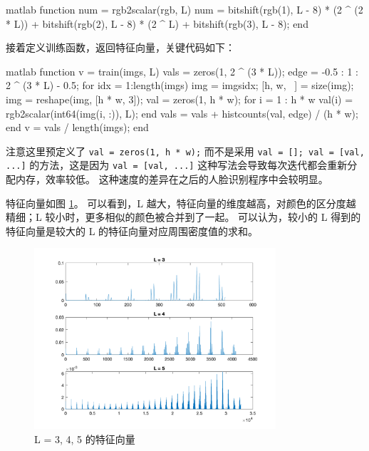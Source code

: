 \documentclass[a4paper]{article}  %
\begin{document}
\begin{codeblock}{matlab}
function num = rgb2scalar(rgb, L)
    num = bitshift(rgb(1), L - 8) * (2 ^ (2 * L)) + bitshift(rgb(2), L - 8) * (2 ^ L) + bitshift(rgb(3), L - 8);
end
\end{codeblock}

接着定义训练函数，返回特征向量，关键代码如下：

\begin{codeblock}{matlab}
function v = train(imgs, L)
    vals = zeros(1, 2 ^ (3 * L));
    edge = -0.5 : 1 : 2 ^ (3 * L) - 0.5;
    for idx = 1:length(imgs)
        img = imgs{idx};
        [h, w, ~] = size(img);
        img = reshape(img, [h * w, 3]);
        val = zeros(1, h * w);
        for i = 1 : h * w
            val(i) = rgb2scalar(int64(img(i, :)), L);
        end
        vals = vals + histcounts(val, edge) / (h * w);
    end
    v = vals / length(imgs);
end
\end{codeblock}

注意这里预定义了 \texttt{val = zeros(1, h * w);} 而不是采用 \texttt{val = []; val = [val, ...]} 的方法，这是因为 \texttt{val = [val, ...]} 这种写法会导致每次迭代都会重新分配内存，效率较低。
这种速度的差异在之后的人脸识别程序中会较明显。

特征向量如图 \ref{fig:4_1_bar}。
可以看到，L 越大，特征向量的维度越高，对颜色的区分度越精细；L 较小时，更多相似的颜色被合并到了一起。
可以认为，较小的 L 得到的特征向量是较大的 L 的特征向量对应周围密度值的求和。

\begin{figure}[ht]
    \centering
    \includegraphics[width=0.8\textwidth]{asserts/4_1_bar.png}
    \caption{
        L = 3, 4, 5 的特征向量
    }\label{fig:4_1_bar}
\end{figure}
\end{document}
